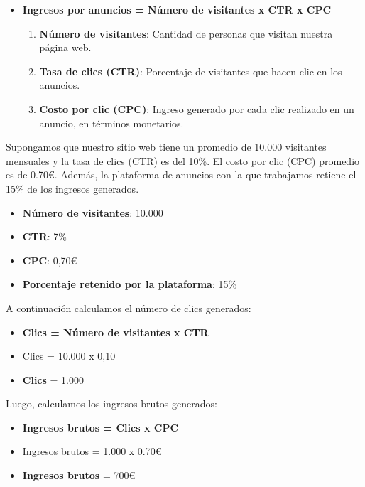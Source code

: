 \begin{itemize}
    \item \textbf{Ingresos por anuncios = Número de visitantes x CTR x CPC }

    \begin{enumerate}
        \item \textbf{Número de visitantes}: Cantidad de personas que visitan nuestra página web.
        \item \textbf{Tasa de clics (CTR)}: Porcentaje de visitantes que hacen clic en los anuncios.
        \item \textbf{Costo por clic (CPC)}: Ingreso generado por cada clic realizado en un anuncio, en términos monetarios.
    \end{enumerate}    
\end{itemize}

Supongamos que nuestro sitio web tiene un promedio de 10.000 visitantes mensuales y la tasa de clics (CTR) es del 10\%. El costo por clic (CPC) promedio es de 0.70€. Además, la plataforma de anuncios con la que trabajamos retiene el 15\% de los ingresos generados.
\begin{itemize}
    \item \textbf{ Número de visitantes}: 10.000
    \item \textbf{CTR}: 7\%
    \item \textbf{CPC}: 0,70€
    \item \textbf{Porcentaje retenido por la plataforma}: 15\% 
\end{itemize}
   
A continuación calculamos el número de clics generados:

\begin{itemize}
    \item \textbf{Clics = Número de visitantes x CTR}
    \item Clics = 10.000 x 0,10 
    \item \textbf{Clics} = 1.000
\end{itemize}

Luego, calculamos los ingresos brutos generados:

\begin{itemize}
    \item \textbf{Ingresos brutos = Clics x CPC }
    \item Ingresos brutos = 1.000 x 0.70€
    \item  \textbf{Ingresos brutos} = 700€
\end{itemize}

